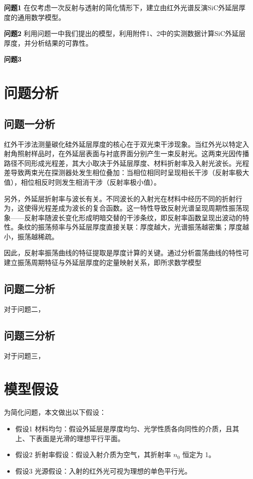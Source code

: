 \documentclass{cumcmthesis}
\begin{document}
\textbf{问题1}  
在仅考虑一次反射与透射的简化情形下，建立由红外光谱反演SiC外延层厚度的通用数学模型。

\textbf{问题2}  
利用问题一中我们提出的模型，利用附件1、2中的实测数据计算SiC外延层厚度，并分析结果的可靠性。

\textbf{问题3} 


\section{问题分析}
\subsection{问题一分析}
红外干涉法测量碳化硅外延层厚度的核心在于双光束干涉现象。当红外光以特定入射角照射样品时，在外延层表面与衬底界面分别产生一束反射光。这两束光因传播路径不同形成光程差，其大小取决于外延层厚度、材料折射率及入射光波长。光程差导致两束光在探测器处发生相位叠加：当相位相同时呈现相长干涉（反射率极大值），相位相反时则发生相消干涉（反射率极小值）。

另外，外延层折射率与波长有关。不同波长的入射光在材料中经历不同的折射行为，这使得光程差成为波长的复合函数。这一特性导致反射光谱呈现周期性振荡现象——反射率随波长变化形成明暗交替的干涉条纹，即反射率函数呈现出波动的特性。条纹的振荡频率与外延层厚度直接关联：厚度越大，光谱振荡越密集；厚度越小，振荡越稀疏。

因此，反射率振荡曲线的特征提取是厚度计算的关键。通过分析震荡曲线的特性可建立振荡周期特征与外延层厚度的定量映射关系，即所求数学模型

\subsection{问题二分析}	
对于问题二，

\subsection{问题三分析}
对于问题三，



\section{模型假设}

为简化问题，本文做出以下假设：

\begin{itemize}[itemindent=2em]
\item 假设1 材料均匀：假设外延层是厚度均匀、光学性质各向同性的介质，且其上、下表面是光滑的理想平行平面。
\item 假设2 折射率假设：假设入射介质为空气，其折射率 $n_0$ 恒定为 1。

\item 假设3 光源假设：入射的红外光可视为理想的单色平行光。
\end{itemize}
\end{document}
